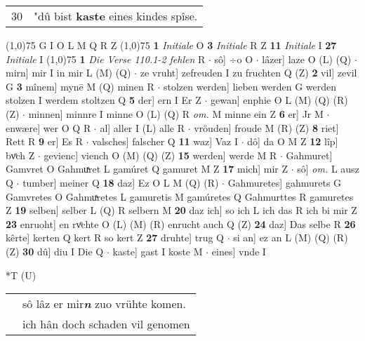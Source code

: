 \documentclass[8pt,a4paper,notitlepage]{article}
\begin{document}
\begin{table}[ht]
\begin{minipage}[t]{0.5\linewidth}
\begin{tabular}{rl}
30 & "dû bist \textbf{kaste} eines kindes spîse.\\ 
\end{tabular}
\scriptsize
\line(1,0){75} \newline
G I O L M Q R Z \newline
\line(1,0){75} \newline
\textbf{1} \textit{Initiale} O  \textbf{3} \textit{Initiale} R Z  \textbf{11} \textit{Initiale} I  \textbf{27} \textit{Initiale} I  \newline
\line(1,0){75} \newline
\textbf{1} \textit{Die Verse 110.1-2 fehlen} R   $\cdot$ sô] ÷o O  $\cdot$ lâzer] laze O (L) (Q)  $\cdot$ mirn] mir I in mir L (M) (Q)  $\cdot$ ze vruht] zefreuden I zu fruchten Q (Z) \textbf{2} vil] zevil G \textbf{3} mînem] mynē M (Q) minen R  $\cdot$ stolzen werden] lieben werden G werden stolzen I werdem stoltzen Q \textbf{5} der] ern I Er Z  $\cdot$ gewan] enphie O L (M) (Q) (R) (Z)  $\cdot$ minnen] minnre I minne O (L) (Q) R \textit{om.} M minne ein Z \textbf{6} er] Jr M  $\cdot$ enwære] wer O Q R  $\cdot$ al] aller I (L) alle R  $\cdot$ vröuden] froude M (R) (Z) \textbf{8} riet] Rett R \textbf{9} er] Es R  $\cdot$ valsches] falscher Q \textbf{11} waz] Vaz I  $\cdot$ dô] da O M Z \textbf{12} lîp] bvͦch Z  $\cdot$ gevienc] viench O (M) (Q) (Z) \textbf{15} werden] werde M R  $\cdot$ Gahmuret] Gamvret O Gahmuͯret L gamúret Q gamuret M Z \textbf{17} mich] mir Z  $\cdot$ sô] \textit{om.} L ausz Q  $\cdot$ tumber] meiner Q \textbf{18} daz] Ez O L M (Q) (R)  $\cdot$ Gahmuretes] gahmurets G Gamvretes O Gahmuͯretes L gamuretis M gamúretes Q Gahmurttes R gamuretes Z \textbf{19} selben] selber L (Q) R selbern M \textbf{20} daz ich] so ich L ich das R ich bi mir Z \textbf{23} enruoht] en rvͦchte O (L) (M) (R) enrucht auch Q (Z) \textbf{24} daz] Das selbe R \textbf{26} kêrte] kerten Q kert R so kert Z \textbf{27} druhte] trug Q  $\cdot$ si an] ez an L (M) (Q) (R) (Z) \textbf{30} dû] diu I Die Q  $\cdot$ kaste] gast I koste M  $\cdot$ eines] vnde I \newline
\end{minipage}
\hspace{0.5cm}
\begin{minipage}[t]{0.5\linewidth}
\small
\begin{center}*T (U)
\end{center}
\begin{tabular}{rl}
 & sô lâz er mir\textit{\textbf{n}} zuo vrühte komen.\\ 
 & ich hân doch schaden vil genomen\\ 

\end{tabular}
\end{minipage}
\end{table}
\end{document}

